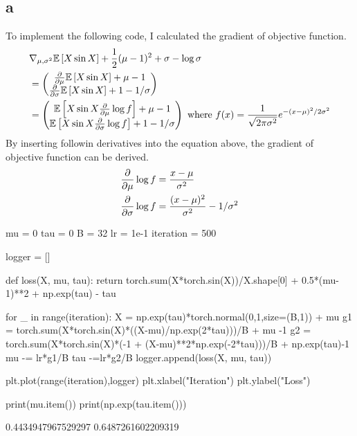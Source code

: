 \documentclass[10pt]{article}
\begin{document}
\subsection*{a}
To implement the following code, I calculated the gradient of objective function. 
\begin{align*}
    &\nabla_{\mu, \sigma^2} \mathbb{E}\left[X \sin X\right] + \frac{1}{2}(\mu - 1)^2 + \sigma - \log \sigma \\
    &= \begin{pmatrix}
        {\partial \over \partial \mu} \mathbb{E}\left[X \sin X\right]  + \mu -1 \\
        {\partial \over \partial \sigma} \mathbb{E}\left[X \sin X\right]  + 1  - 1/\sigma
    \end{pmatrix} \\
    &=  \begin{pmatrix}
        \mathbb{E}\left[X \sin X {\partial \over \partial \mu } \log f \right]  + \mu -1 \\
       \mathbb{E}\left[X \sin X  {\partial \over \partial \sigma} \log f \right]  + 1  - 1/\sigma 
    \end{pmatrix} \text{ where } f(x) = \frac{1}{\sqrt{2\pi \sigma^2}}e^{-(x-\mu)^2/2\sigma^2} 
\end{align*}
By inserting followin derivatives into the equation above, the gradient of objective function can be derived.
\begin{align*}
    {\partial \over \partial \mu } \log f &= \frac{x-\mu}{\sigma^2}\\
    {\partial \over \partial \sigma } \log f &= \frac{(x-\mu)^2}{\sigma^2} - 1/\sigma^2
\end{align*}
\begin{python}
mu = 0
tau = 0
B = 32
lr = 1e-1
iteration = 500

logger = []

def loss(X, mu, tau):
    return torch.sum(X*torch.sin(X))/X.shape[0] + 0.5*(mu-1)**2 + np.exp(tau) - tau

for _ in range(iteration):
    X = np.exp(tau)*torch.normal(0,1,size=(B,1)) + mu
    g1 = torch.sum(X*torch.sin(X)*((X-mu)/np.exp(2*tau)))/B + mu -1
    g2 = torch.sum(X*torch.sin(X)*(-1 + (X-mu)**2*np.exp(-2*tau)))/B + np.exp(tau)-1
    mu -= lr*g1/B
    tau -=lr*g2/B
    logger.append(loss(X, mu, tau))

plt.plot(range(iteration),logger)
plt.xlabel("Iteration")
plt.ylabel("Loss")

print(mu.item())
print(np.exp(tau.item()))

\end{python}
\begin{python}
0.4434947967529297
0.6487261602209319
\end{python}
\end{document}
